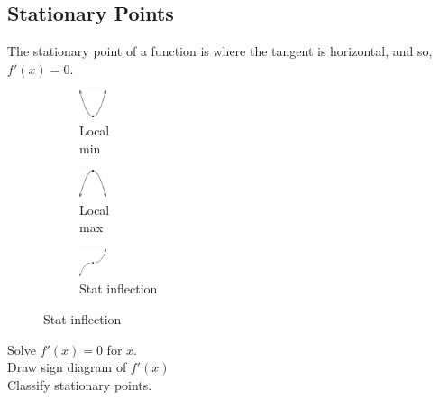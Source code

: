 \documentclass[10pt, a4paper, titlepage]{article}
\begin{document}
\begin{multicols*}{3}
\subsection{Stationary Points}
The stationary point of a function is where the tangent is horizontal, and so, $f'(x)=0$.
\begin{figure}[H]
	\centering
	\begin{subfigure}[b]{0.1\textwidth}
		\centering
		\includegraphics[width=0.8cm]{local_min.png}
		\caption*{Local\\min}
	\end{subfigure}
	\hfill
	\begin{subfigure}[b]{0.1\textwidth}
		\centering
		\includegraphics[width=0.8cm]{local_max.png}
		\caption*{Local\\max}
	\end{subfigure}
	\hfill
	\begin{subfigure}[b]{0.1\textwidth}
		\centering
		\includegraphics[width=0.8cm]{stat_inflection.png}
		\caption*{Stat inflection}
	\end{subfigure}
\end{figure}
Solve $f'(x)=0$ for $x$.\\
Draw sign diagram of $f'(x)$\\
Classify stationary points.\\

\dotfill

\end{multicols*}
\end{document}
